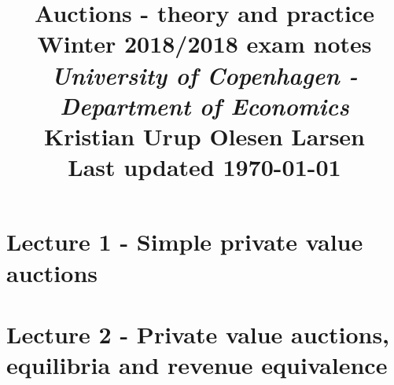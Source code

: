 \documentclass[12pt, a4paper]{article}
\theoremstyle{definition}
\begin{document}
\begin{spacing}{1.213}

\title{ Auctions - theory and practice  \\ \Large Winter 2018/2018 exam notes \\ \large \textit{University of Copenhagen - Department of Economics}  \\
\normalsize Kristian Urup Olesen Larsen \\
\normalsize Last updated \today  } %
\date{} %
\maketitle %
\setcounter{page}{1} %


\pagebreak

\tableofcontents
\newpage

\section{Lecture 1 - Simple private value auctions}


\section{Lecture 2 - Private value auctions, equilibria and revenue equivalence}

\end{spacing}
\end{document}
